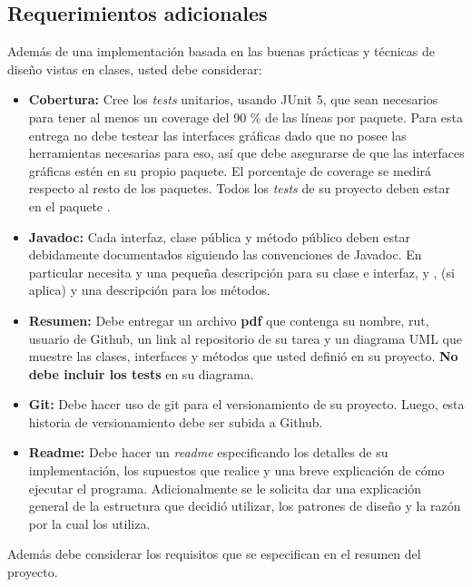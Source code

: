   \subsection{Requerimientos adicionales}
    Además de una implementación basada en las buenas prácticas y técnicas de diseño 
    vistas en clases, usted debe considerar:
    \begin{itemize}
      \item \textbf{Cobertura:} Cree los \textit{tests} unitarios, usando JUnit 5, que sean 
        necesarios para tener al menos un coverage del 90 \% de las líneas por 
        paquete.
        Para esta entrega no debe testear las interfaces gráficas dado que no posee las 
        herramientas necesarias para eso, así que debe asegurarse de que las interfaces 
        gráficas estén en su propio paquete.
        El porcentaje de coverage se medirá respecto al resto de los paquetes.
        Todos los \textit{tests} de su proyecto deben estar en el paquete .
      \item \textbf{Javadoc:} Cada interfaz, clase pública y método público deben 
        estar debidamente documentados siguiendo las convenciones de 
        Javadoc\footnotemark. 
        En particular necesita  y una pequeña descripción para su 
        clase e interfaz, y ,  (si aplica) y una 
        descripción para los métodos.
      \item \textbf{Resumen:} Debe entregar un archivo \textbf{pdf} que contenga su 
        nombre, rut, usuario de Github, un link al repositorio de su tarea y un 
        diagrama UML que muestre las clases, interfaces y métodos que usted 
        definió en su proyecto. 
        \textbf{No debe incluir los tests} en su diagrama.
      \item \textbf{Git:} Debe hacer uso de git para el versionamiento de su 
        proyecto. 
        Luego, esta historia de versionamiento debe ser subida a Github.
      \item \textbf{Readme:} Debe hacer un \textit{readme} especificando los detalles de
        su implementación, los supuestos que realice y una breve explicación de cómo 
        ejecutar el programa.
        Adicionalmente se le solicita dar una explicación general de la estructura que 
        decidió utilizar, los patrones de diseño y la razón por la cual los utiliza.
    \end{itemize}

    Además debe considerar los requisitos que se especifican en el resumen del proyecto.
%